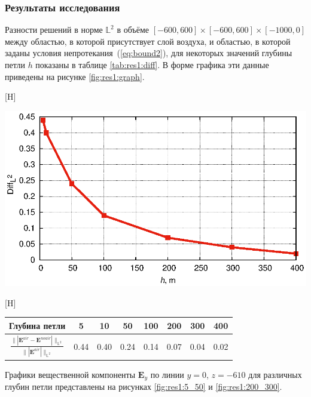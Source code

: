 \documentclass[a4paper,14pt]{article}
\makeatletter
\renewenvironment{figure}[1][\fps@figure]{
  \edef\@tempa{\noexpand\@float{figure}[#1]}
  \@tempa
  \addtocounter{foofigure}{1}
}{
  \end@float
}
\renewenvironment{table}[1][\fps@table]{
  \edef\@tempa{\noexpand\@float{table}[#1]}
  \@tempa
  \addtocounter{footable}{1}
}{
  \end@float
}
\makeatother
\begin{document}
\subsubsection{Результаты исследования}
Разности решений в норме $\mathbb{L}^2$ в объёме $[-600,600] \times [-600,600] \times [-1000,0]$ между областью, в которой присутствует слой воздуха, и областью, в которой заданы условия непротекания~(\ref{eq:bound2}), для некоторых значений глубины петли $h$ показаны в таблице \ref{tab:res1:diff}. В форме графика эти данные приведены на рисунке \ref{fig:res1:graph}.

\begin{figure}[H]
	\centering
	\includegraphics[scale=1]{research-1/presentation/presentation.eps}
	\caption{график изменения относительной разности решений при изменении глубины}
	\label{fig:res1:graph}
\end{figure}

\begin{table}[H]
	\caption{относительные разности решений}
	\label{tab:res1:diff}
	\begin{tabularx}{\textwidth}{|C{2.4}|C{0.8}|C{0.8}|C{0.8}|C{0.8}|C{0.8}|C{0.8}|C{0.8}|}
		\hline Глубина петли & 5 & 10 & 50 & 100 & 200 & 300 & 400 \\
		\hline $\displaystyle \frac{\| | \mathbf{E}^{air} - \mathbf{E}^{noair} | \|_{\mathbb{L}^2}}{\| | \mathbf{E}^{air} | \|_{\mathbb{L}^2}}$ & 0.44 & 0.40 & 0.24 & 0.14 & 0.07 & 0.04 & 0.02 \\
		\hline
	\end{tabularx}
\end{table}

Графики вещественной компоненты $\mathbf{E}_y$ по линии $y=0$, $z=-610$ для различных глубин петли представлены на рисунках \ref{fig:res1:5_50} и \ref{fig:res1:200_300}.
\end{document}
